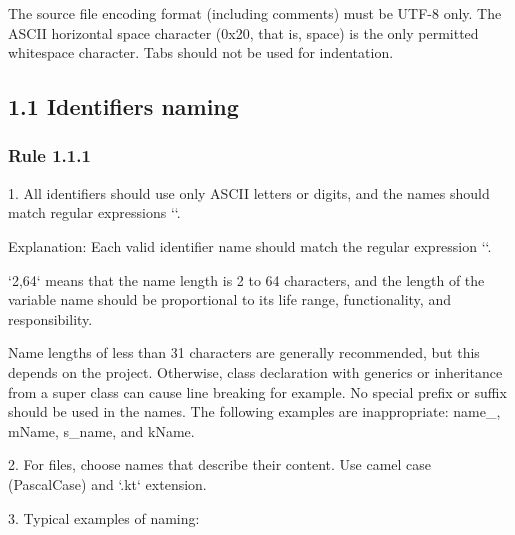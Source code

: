 The source file encoding format (including comments) must be UTF-8 only. The ASCII horizontal space character (0x20, that is, space) is the only permitted whitespace character. Tabs should not be used for indentation.



\subsection*{\textbf{1.1 Identifiers naming}}

\subsubsection*{\textbf{Rule 1.1.1}}
\leavevmode\newline

1.	All identifiers should use only ASCII letters or digits, and the names should match regular expressions ``.

Explanation: Each valid identifier name should match the regular expression ``.

`{2,64}` means that the name length is 2 to 64 characters, and the length of the variable name should be proportional to its life range, functionality, and responsibility.

Name lengths of less than 31 characters are generally recommended, but this depends on the project. Otherwise, class declaration with generics or inheritance from a super class can cause line breaking for example. No special prefix or suffix should be used in the names. The following examples are inappropriate: name\_, mName, s\_name, and kName.



2.	For files, choose names that describe their content. Use camel case (PascalCase) and `.kt` extension.



3.	Typical examples of naming:



